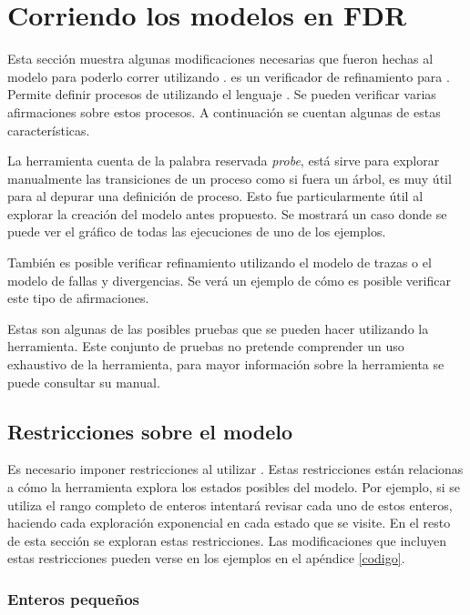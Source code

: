 \section{Corriendo los modelos en FDR}

Esta sección muestra algunas modificaciones necesarias que fueron hechas al modelo para poderlo correr utilizando \FDR. \FDR es un verificador de refinamiento para \CSP. Permite definir procesos de \CSP utilizando el lenguaje \CSPm. Se pueden verificar varias afirmaciones sobre estos procesos. A continuación se cuentan algunas de estas características.

La herramienta cuenta de la palabra reservada \textit{probe}, está sirve para explorar manualmente las transiciones de un proceso como si fuera un árbol, es muy útil para al depurar una definición de proceso. Esto fue particularmente útil al explorar la creación del modelo antes propuesto. Se mostrará un caso donde se puede ver el gráfico de todas las ejecuciones de uno de los ejemplos. 
 
También es posible verificar refinamiento utilizando el modelo de trazas o el modelo de fallas y divergencias. Se verá un ejemplo de cómo es posible verificar este tipo de afirmaciones.

Estas son algunas de las posibles pruebas que se pueden hacer utilizando la herramienta. Este conjunto de pruebas no pretende comprender un uso exhaustivo de la herramienta, para mayor información sobre la herramienta se puede consultar su manual\cite{fdrmanual}.

\subsection{Restricciones sobre el modelo}

Es necesario imponer restricciones al utilizar \FDR. Estas restricciones están relacionas a cómo la herramienta explora los estados posibles del modelo. Por ejemplo, si se utiliza el rango completo de enteros intentará revisar cada uno de estos enteros, haciendo cada exploración exponencial en cada estado que se visite. En el resto de esta sección se exploran estas restricciones. Las modificaciones que incluyen estas restricciones pueden verse en los ejemplos en el apéndice \ref{codigo}.

\subsubsection*{Enteros pequeños}

